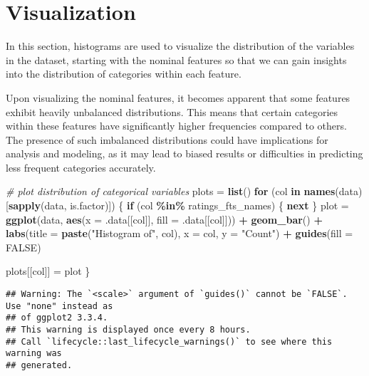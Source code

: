 \documentclass[
]{article}
\newenvironment{Shaded}{\begin{snugshade}}{\end{snugshade}}
\newcommand{\AttributeTok}[1]{\textcolor[rgb]{0.13,0.29,0.53}{#1}}
\newcommand{\CommentTok}[1]{\textcolor[rgb]{0.56,0.35,0.01}{\textit{#1}}}
\newcommand{\ConstantTok}[1]{\textcolor[rgb]{0.56,0.35,0.01}{#1}}
\newcommand{\ControlFlowTok}[1]{\textcolor[rgb]{0.13,0.29,0.53}{\textbf{#1}}}
\newcommand{\FunctionTok}[1]{\textcolor[rgb]{0.13,0.29,0.53}{\textbf{#1}}}
\newcommand{\NormalTok}[1]{#1}
\newcommand{\OtherTok}[1]{\textcolor[rgb]{0.56,0.35,0.01}{#1}}
\newcommand{\SpecialCharTok}[1]{\textcolor[rgb]{0.81,0.36,0.00}{\textbf{#1}}}
\newcommand{\StringTok}[1]{\textcolor[rgb]{0.31,0.60,0.02}{#1}}
\begin{document}
\hypertarget{visualization}{%
\section{Visualization}\label{visualization}}

In this section, histograms are used to visualize the distribution of
the variables in the dataset, starting with the nominal features so that
we can gain insights into the distribution of categories within each
feature.

Upon visualizing the nominal features, it becomes apparent that some
features exhibit heavily unbalanced distributions. This means that
certain categories within these features have significantly higher
frequencies compared to others. The presence of such imbalanced
distributions could have implications for analysis and modeling, as it
may lead to biased results or difficulties in predicting less frequent
categories accurately.

\begin{Shaded}
\begin{Highlighting}[]
\CommentTok{\# plot distribution of categorical variables}
\NormalTok{plots }\OtherTok{=} \FunctionTok{list}\NormalTok{()}
\ControlFlowTok{for}\NormalTok{ (col }\ControlFlowTok{in} \FunctionTok{names}\NormalTok{(data)[}\FunctionTok{sapply}\NormalTok{(data, is.factor)]) \{}
  \ControlFlowTok{if}\NormalTok{ (col }\SpecialCharTok{\%in\%}\NormalTok{ ratings\_fts\_names) \{}
    \ControlFlowTok{next}
\NormalTok{  \}}
\NormalTok{  plot }\OtherTok{=} \FunctionTok{ggplot}\NormalTok{(data, }\FunctionTok{aes}\NormalTok{(}\AttributeTok{x =}\NormalTok{ .data[[col]], }\AttributeTok{fill =}\NormalTok{ .data[[col]])) }\SpecialCharTok{+}
  \FunctionTok{geom\_bar}\NormalTok{() }\SpecialCharTok{+}
  \FunctionTok{labs}\NormalTok{(}\AttributeTok{title =} \FunctionTok{paste}\NormalTok{(}\StringTok{"Histogram of"}\NormalTok{, col), }\AttributeTok{x =}\NormalTok{ col, }\AttributeTok{y =} \StringTok{"Count"}\NormalTok{) }\SpecialCharTok{+}
  \FunctionTok{guides}\NormalTok{(}\AttributeTok{fill =} \ConstantTok{FALSE}\NormalTok{)}

\NormalTok{  plots[[col]] }\OtherTok{=}\NormalTok{ plot}
\NormalTok{\}}
\end{Highlighting}
\end{Shaded}

\begin{verbatim}
## Warning: The `<scale>` argument of `guides()` cannot be `FALSE`. Use "none" instead as
## of ggplot2 3.3.4.
## This warning is displayed once every 8 hours.
## Call `lifecycle::last_lifecycle_warnings()` to see where this warning was
## generated.
\end{verbatim}
\end{document}
